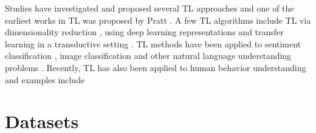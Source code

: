 \documentclass{article}
\begin{document}
Studies have investigated and proposed several TL approaches \cite{pan2010survey} and one of the earliest works in TL was proposed by Pratt \cite{pratt1993discriminability}.
A few TL algorithms include TL via dimensionality reduction \cite{pan2008transfer}, using deep learning representations \cite{bengio2012deep, mesnil2012unsupervised} and transfer learning in a transductive setting \cite{rohrbach2013transfer}.  
TL methods have been applied to sentiment classification \cite{blitzer2007biographies}, image classification \cite{wu2004improving} and other natural language understanding problems \cite{arnold2007comparative,blitzer2006domain}. 
Recently, TL has also been applied to human behavior understanding and examples include 


\section{Datasets}

\end{document}
